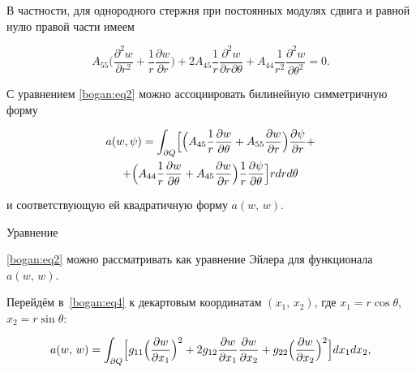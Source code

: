 В частности, для однородного стержня при постоянных модулях сдвига и равной нулю правой части имеем

\begin{equation}

\label{bogan:eq3}

 A_{55}\biggl(\frac{\partial^2 w}{\partial

r^2}+\frac{1}{r}\frac{\partial w}{\partial

r}\biggr)+2A_{45}\frac{1}{r}\frac{\partial^2 w}{{\partial

r}{\partial \theta}}+ A_{44}\frac{1}{r^2}\frac{\partial^2

w}{\partial \theta^2}=0.

\end{equation}

С уравнением \eqref{bogan:eq2} можно ассоциировать билинейную симметричную форму

\begin{multline}

\label{bogan:eq4}

 a(w, \psi)=\int_{\partial Q} 

 \Bigl [ \Bigl(A_{45}\dfrac{1}{r}\dfrac{\partial w}{\partial \theta}+A_{55}\dfrac{\partial w}{\partial r} \Bigr)\dfrac{\partial

\psi}{\partial r}+ \\

+ \Bigl(A_{44}\dfrac{1}{r}\dfrac{\partial w}{\partial \theta}+A_{45}\dfrac{\partial w}{\partial r}

\Bigr)\dfrac{1}{r}\dfrac{\partial \psi}{\partial \theta} \Bigr

] rdrd\theta

\end{multline}

и соответствующую ей квадратичную форму $a( w,\, w)$. 

Уравнение

\eqref{bogan:eq2} можно рассматривать как уравнение Эйлера для функционала $a(w,\, w)$. 

Перейдём в~\eqref{bogan:eq4} к декартовым координатам $ (x_1,\, x_2)$, где $ x_1 =r \cos \theta$, $x_2= r \sin \theta$:

\begin{equation}

\label{bogan:eq5} a(w,\, w)=\int_{\partial Q}

\Bigl[g_{11}\Bigl(\dfrac{\partial w}{\partial x_1}\Bigr)^2+2 g_{12}\dfrac{\partial w}{\partial x_1}\dfrac{\partial w}{\partial

x_2}+g_{22}\Bigl(\dfrac{\partial w}{\partial x_2}\Bigr)^2 \Bigr] dx_1dx_2,

\end{equation}

